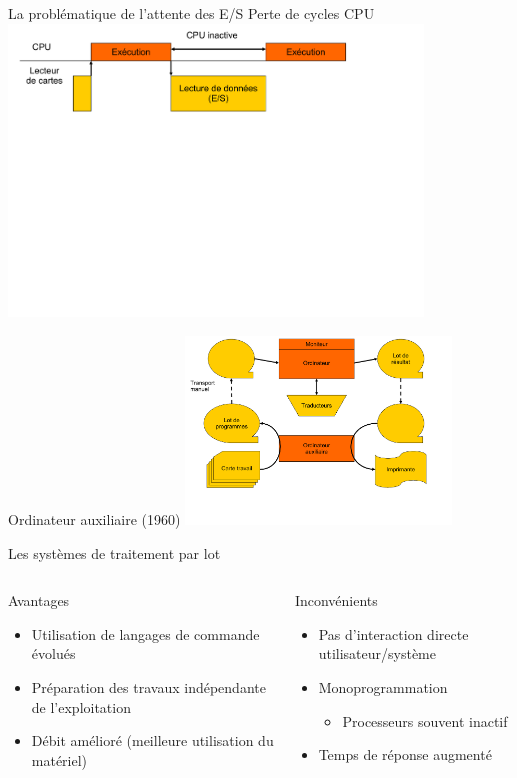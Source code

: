 \begin{frame}{La problématique de l'attente des E/S}
Perte de cycles CPU
\includegraphics[width=11cm]{../illustration/attente_es.pdf}
\end{frame}

\begin{frame}{Ordinateur auxiliaire (1960)}
\includegraphics[height=5cm]{../illustration/ordinateur_aux.pdf}
\end{frame}

\begin{frame}{Les systèmes de traitement par lot}
\begin{columns}
\begin{block}{Avantages}
\begin{itemize}
\item Utilisation de langages de commande évolués
\item Préparation des travaux indépendante de l’exploitation
\item Débit amélioré (meilleure utilisation du matériel)
\end{itemize}
\end{block}
\begin{block}{Inconvénients}
\begin{itemize}
\item Pas d'interaction directe utilisateur/système
\item Monoprogrammation
\begin{itemize}
\item Processeurs souvent inactif
\end{itemize}
\item Temps de réponse augmenté
\end{itemize}
\end{block}
\end{columns}
\end{frame}

